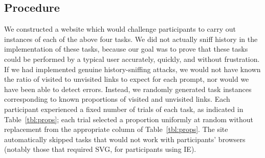 \documentclass[conference]{IEEEtran}
\begin{document}
\subsection{Procedure}

We constructed a website which would challenge participants to carry
out instances of each of the above four tasks.  We did not actually
sniff history in the implementation of these tasks, because our goal
was to prove that these tasks could be performed by a typical user
accurately, quickly, and without frustration.  If we had implemented
genuine history-sniffing attacks, we would not have known the ratio of
visited to unvisited links to expect for each prompt, nor would we
have been able to detect errors.  Instead, we randomly generated task
instances corresponding to known proportions of visited and unvisited
links. Each participant experienced a fixed number of trials of each
task, as indicated in Table~\ref{tbl:props}; each trial selected a
proportion uniformly at random without replacement from the
appropriate column of Table~\ref{tbl:props}.  The site automatically
skipped tasks that would not work with participants' browsers (notably
those that required SVG, for participants using IE).
\end{document}
